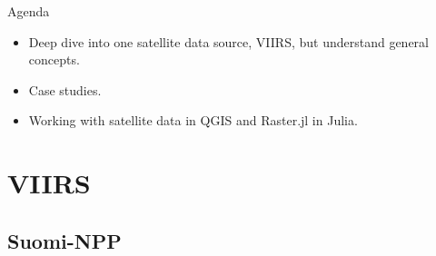 \documentclass[aspectratio=169]{beamer} %
\begin{document}
\begin{frame}{Agenda}

  \begin{itemize}
    \item Deep dive into one satellite data source, VIIRS, but understand general concepts.
    \item Case studies. 
    \item Working with satellite data in QGIS and Raster.jl in Julia. 
  \end{itemize}
\end{frame}
  
  \section{VIIRS}
  
  \subsection{Suomi-NPP}
  
\end{document}
